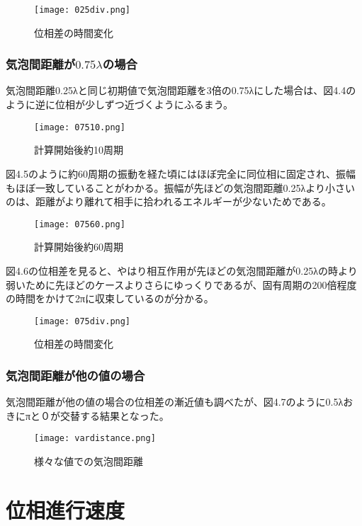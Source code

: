 \documentclass[11pt,a4j]{jreport}
\begin{document}
\begin{figure}[tbh]
\centering
\texttt{[image: 025div.png]}
\caption{位相差の時間変化}
\label{fig:025div}
\end{figure}

\subsection{気泡間距離が$0.75\lambda$の場合}

気泡間距離0.25λと同じ初期値で気泡間距離を3倍の0.75λにした場合は、図4.4のように逆に位相が少しずつ近づくようにふるまう。

\begin{figure}[tbh]
\centering
\texttt{[image: 07510.png]}
\caption{計算開始後約10周期}
\label{fig:07510}
\end{figure}

図4.5のように約60周期の振動を経た頃にはほぼ完全に同位相に固定され、振幅もほぼ一致していることがわかる。振幅が先ほどの気泡間距離0.25λより小さいのは、距離がより離れて相手に拾われるエネルギーが少ないためである。

\begin{figure}[tbh]
\centering
\texttt{[image: 07560.png]}
\caption{計算開始後約60周期}
\label{fig:07560}
\end{figure}

図4.6の位相差を見ると、やはり相互作用が先ほどの気泡間距離が0.25λの時より弱いために先ほどのケースよりさらにゆっくりであるが、固有周期の200倍程度の時間をかけて2πに収束しているのが分かる。

\begin{figure}[tbh]
\centering
\texttt{[image: 075div.png]}
\caption{位相差の時間変化}
\label{fig:075div}
\end{figure}

\subsection{気泡間距離が他の値の場合}

気泡間距離が他の値の場合の位相差の漸近値も調べたが、図4.7のように0.5λおきにπと０が交替する結果となった。

\begin{figure}[tbh]
\centering
\texttt{[image: vardistance.png]}
\caption{様々な値での気泡間距離}
\label{fig:vardistance}
\end{figure}

\chapter{位相進行速度}
\end{document}
